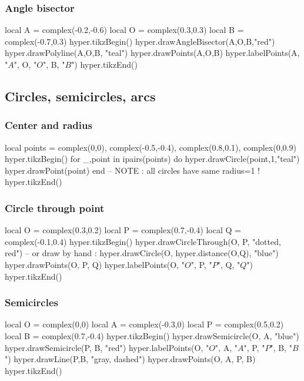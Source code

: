 \documentclass{article}
\begin{document}
\subsubsection{Angle bisector}
\begin{codeandresult}
\begin{luacode*}
local A = complex(-0.2,-0.6)
local O = complex(0.3,0.3)
local B = complex(-0.7,0.3)
hyper.tikzBegin()
hyper.drawAngleBisector(A,O,B,"red")
hyper.drawPolyline(A,O,B, "teal")
hyper.drawPoints(A,O,B)
hyper.labelPoints(A, "$A$", O, "$O$", B, "$B$")
hyper.tikzEnd()
\end{luacode*}
\end{codeandresult}

\subsection{Circles, semicircles, arcs}

\subsubsection{Center and radius}
\begin{codeandresult}
\begin{luacode*}
local points = {
	complex(0,0),
	complex(-0.5,-0.4),
	complex(0.8,0.1),
	complex(0,0.9)
}
hyper.tikzBegin()
for _,point in ipairs(points) do
	hyper.drawCircle(point,1,"teal")
	hyper.drawPoint(point)
end
-- NOTE : all circles have same radius=1 !
hyper.tikzEnd()
\end{luacode*}
\end{codeandresult}


\subsubsection{Circle through point}
\begin{codeandresult}
\begin{luacode*}
local O = complex(0.3,0.2)
local P = complex(0.7,-0.4)
local Q = complex(-0.1,0.4)
hyper.tikzBegin()
hyper.drawCircleThrough(O, P, "dotted, red")
-- or draw by hand : 
hyper.drawCircle(O, hyper.distance(O,Q), "blue")
hyper.drawPoints(O, P, Q)
hyper.labelPoints(O, "$O$", P, "$P$", Q, "$Q$")
hyper.tikzEnd()
\end{luacode*}
\end{codeandresult}

\subsubsection{Semicircles}
\begin{codeandresult}
\begin{luacode*}
local O = complex(0,0)
local A = complex(-0.3,0)
local P = complex(0.5,0.2)
local B = complex(0.7,-0.4)
hyper.tikzBegin()
hyper.drawSemicircle(O, A, "blue")
hyper.drawSemicircle(P, B, "red")
hyper.labelPoints(O, "$O$", A, "$A$", P, "$P$", B, "$B$")
hyper.drawLine(P,B, "gray, dashed")
hyper.drawPoints(O, A, P, B)
hyper.tikzEnd()
\end{luacode*}
\end{codeandresult}
\end{document}
